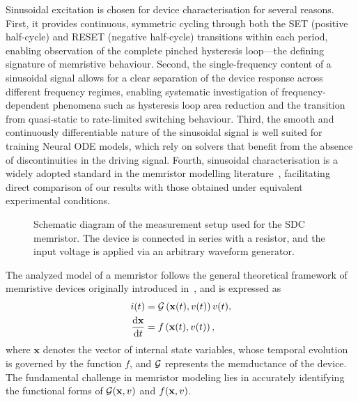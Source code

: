 \documentclass{ieeeaccess}
\begin{document}
Sinusoidal excitation is chosen for device characterisation for several reasons. First, it provides continuous, symmetric cycling through both the SET (positive half-cycle) and RESET (negative half-cycle) transitions within each period, enabling observation of the complete pinched hysteresis loop---the defining signature of memristive behaviour. Second, the single-frequency content of a sinusoidal signal allows for a clear separation of the device response across different frequency regimes, enabling systematic investigation of frequency-dependent phenomena such as hysteresis loop area reduction and the transition from quasi-static to rate-limited switching behaviour. Third, the smooth and continuously differentiable nature of the sinusoidal signal is well suited for training Neural ODE models, which rely on solvers that benefit from the absence of discontinuities in the driving signal. Fourth, sinusoidal characterisation is a widely adopted standard in the memristor modelling literature~\cite{Kvatinsky2015, Ostrovskii2021,Bednarz2024}, facilitating direct comparison of our results with those obtained under equivalent experimental conditions.

\begin{figure}[!t]
  \centering
  \resizebox{2.5in}{!}{}
  \vspace{-0.5in}
  \caption{Schematic diagram of the measurement setup used for the SDC memristor. The device is connected in series with a resistor, and the input voltage is applied via an arbitrary waveform generator.}
  \label{fig:memristor_setup}
\end{figure}


The analyzed model of a memristor follows the general theoretical framework of memristive devices originally introduced in~\cite{Chua1976}, and is expressed as
\newcommand{\xvec}{\mathbf{x}}
\begin{subequations}
  \label{eq:memristor_model}
  \begin{align}
    \ia(t)                    & = \G \left(\xvec(t),\ua(t)\right) \ua(t), \label{eq:memristor_model1} \\
    \frac{\der \xvec}{\der t} & = f\left(\xvec(t),\ua(t)\right), \label{eq:memristor_model2}
  \end{align}
\end{subequations}
where \(\xvec\) denotes the vector of internal state variables, whose temporal evolution is governed by the function \(f\), and \(\mathcal{G}\) represents the memductance of the device. The fundamental challenge in memristor modeling lies in accurately identifying the functional forms of \(\G(\xvec,\ua)\) and \(f(\xvec,\ua)\).
\end{document}
